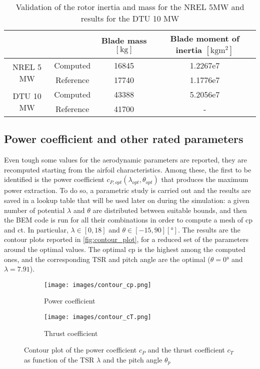 \begin{table}[htb]
 \caption{Validation of the rotor inertia and mass for the NREL 5MW and results for the DTU 10 MW}
\centering
	\begin{tabular}{cccc}
		\toprule
		              &             & Blade mass $\left[\si{\kilo\gram}\right]$ & Blade moment of inertia $\left[\si{\kilo\gram\square\meter}\right]$\\ \midrule
                \multirow{2}{*}{NREL 5 MW}		     &  Computed 	& 16845	&  1.2267e7\\
		              & Reference	\cite{NREL_5MW_reference} & 17740 &  1.1776e7\\ \midrule
            \multirow{2}{*}{DTU 10 MW}& Computed    &  43388 & 5.2056e7\\
            & Reference \cite{review_of_scaling_low} & 41700 & -\\ 
		\bottomrule
	\end{tabular}
 \label{tab:rotor_inertia}
\end{table}

\subsection{Power coefficient and other rated parameters}\label{subsec:lookup_cp}
Even tough some values for the aerodynamic parameters are reported, they are recomputed starting from the airfoil characteristics. Among these, the first to be identified is the power coefficient $c_{P, opt}(\lambda_{opt}, \theta_{opt})$ that produces the maximum power extraction. To do so, a parametric study is carried out and the results are saved in a lookup table that will be used later on during the simulation: a given number of potential $\lambda$ and $\theta$ are distributed between suitable bounds, and then the \acrshort{BEM} code is run for all their combinations in order to compute a mesh of \acrshort{cp} and \acrshort{ct}. In particular, $\lambda \in \left[0, 18\right]$  and $\theta \in \left[-15, 90\right] \left[\si{\degree}\right]$. The results are the contour plots reported in \autoref{fig:contour_plot}, for a reduced set of the parameters around the optimal values. The optimal \acrlong{cp} is the highest among the computed ones, and the corresponding \acrshort{TSR} and pitch angle are the optimal ($\theta=0\si{\degree}$ and $\lambda=7.91$). 

\begin{figure}[htb]
    \centering
    \begin{subfigure}{0.49\textwidth}
    \centering
    \texttt{[image: images/contour\_cp.png]}
    \caption{Power coefficient}
    \label{fig:contour_cp}
    \end{subfigure}
    \begin{subfigure}{0.49\textwidth}
    \centering
    \texttt{[image: images/contour\_cT.png]}
    \caption{Thrust coefficient}
    \label{fig:contour_cT}
    \end{subfigure}
    \caption{Contour plot of the power coefficient $c_P$ and  the thrust coefficient $c_T$ as function of the \acrlong{TSR} $\lambda$ and the pitch angle $\theta_p$}
    \label{fig:contour_plot}
\end{figure}

